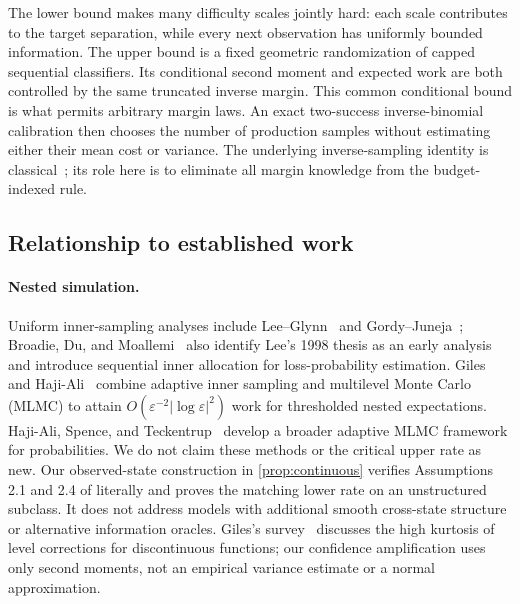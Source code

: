 The lower bound makes many difficulty scales jointly hard: each scale
contributes to the target separation, while every next observation has
uniformly bounded information. The upper bound is a fixed geometric
randomization of capped sequential classifiers. Its conditional second
moment and expected work are both controlled by the same truncated inverse
margin. This common conditional bound is what permits arbitrary margin laws.
An exact two-success inverse-binomial calibration then chooses the number
of production samples without estimating either their mean cost or variance.
The underlying inverse-sampling identity is classical~\cite{haldane}; its
role here is to eliminate all margin knowledge from the budget-indexed rule.

\subsection{Relationship to established work}
\paragraph{Nested simulation.}
Uniform inner-sampling analyses include Lee--Glynn~\cite{leeglynn} and
Gordy--Juneja~\cite{gordyjuneja}; Broadie, Du, and Moallemi~\cite{broadie}
also identify Lee's 1998 thesis as an early analysis and introduce sequential
inner allocation for loss-probability estimation.
Giles and Haji-Ali~\cite{gileshajiali} combine adaptive inner sampling and
multilevel Monte Carlo (MLMC) to attain
$O(\varepsilon^{-2}|\log\varepsilon|^2)$ work for thresholded nested expectations.
Haji-Ali, Spence, and Teckentrup~\cite{hajispence} develop a broader adaptive
MLMC framework for probabilities. We do not claim these methods or the
critical upper rate as new. Our observed-state construction in
\cref{prop:continuous} verifies Assumptions 2.1 and 2.4 of
\cite{gileshajiali} literally and proves the matching lower rate on an
unstructured subclass. It does not address models with additional smooth
cross-state structure or alternative information oracles.
Giles's survey~\cite{gilessurvey} discusses the high kurtosis of level
corrections for discontinuous functions; our confidence amplification uses
only second moments, not an empirical variance estimate or a normal approximation.

